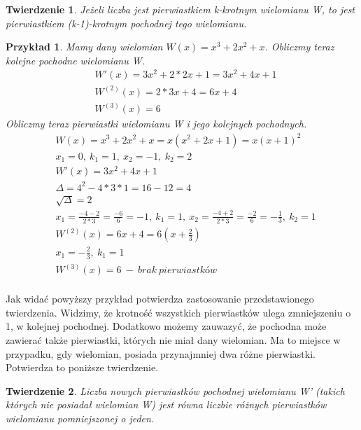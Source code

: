 \documentclass[twoside,a4paper]{book}
\newtheorem{theorem}{Twierdzenie}
\newtheorem{example}{Przykład}
\begin{document}
\begin{theorem}
	Jeżeli liczba jest pierwiastkiem k-krotnym wielomianu W, to jest pierwiastkiem (k-1)-krotnym pochodnej tego wielomianu.
\end{theorem}

\begin{example}
	Mamy dany wielomian $W(x) = x^3 + 2x^2 + x$. Obliczmy teraz kolejne pochodne wielomianu W.
	\begin{equation}
	\begin{split}
	&W'(x) = 3x^2 + 2*2x + 1 = 3x^2 + 4x + 1 \\
	&W^{(2)}(x) = 2*3x + 4 = 6x + 4 \\
	&W^{(3)}(x) = 6
	\end{split}
	\end{equation}
	Obliczmy teraz pierwiastki wielomianu W i jego kolejnych pochodnych.
	\begin{equation}
	\begin{split}
	&W(x) = x^3 + 2x^2 + x = x(x^2 + 2x +1) = x(x + 1)^2 \\
	&x_1 = 0,\ k_1 = 1,\ x_2 = -1,\ k_2 = 2 \\
	&W'(x) = 3x^2 + 4x + 1 \\
	&\Delta = 4^2 - 4*3*1 = 16 - 12 = 4 \\
	&\sqrt{\Delta} = 2 \\
	&x_1 = \frac{-4-2}{2*3} = \frac{-6}{6} = -1,\ k_1 = 1,\ x_2 = \frac{-4+2}{2*3} = \frac{-2}{6} = -\frac{1}{3},\ k_2 = 1 \\
	&W^{(2)}(x) = 6x + 4 = 6 (x + \frac{2}{3}) \\
	&x_1 = -\frac{2}{3},\ k_1 = 1 \\
	&W^{(3)}(x) = 6\ -\ brak\ pierwiastków \\
	\end{split}
	\end{equation}
\end{example}

Jak widać powyższy przykład potwierdza zastosowanie przedstawionego twierdzenia. Widzimy, że krotność wszystkich pierwiastków ulega zmniejszeniu o 1, w kolejnej pochodnej. Dodatkowo możemy zauwazyć, że pochodna może zawierać także pierwiastki, których nie miał dany wielomian. Ma to miejsce w przypadku, gdy wielomian, posiada przynajmniej dwa różne pierwiastki. Potwierdza to poniższe twierdzenie.

\begin{theorem}
	Liczba nowych pierwiastków pochodnej wielomianu W' (takich których nie posiadał wielomian W) jest równa liczbie różnych pierwiastków wielomianu pomniejszonej o jeden.
\end{theorem}
\end{document}
